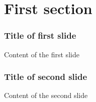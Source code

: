 \section{First section}

\begin{frame}
\frametitle{Title of first slide}
Content of the first slide
\end{frame}

\begin{frame}
\frametitle{Title of second slide}
Content of the second slide
\end{frame}
